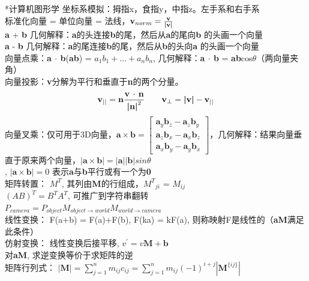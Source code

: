 \documentclass[UTF8]{ctexart}
\makeatletter
\renewcommand{\section}{\@startsection{section}{1}{0mm}
  {-\baselineskip}{0.5\baselineskip}{\bf\leftline}}
\makeatother
\begin{document}
\section*{计算机图形学}
\noindent 坐标系模拟：拇指x，食指y，中指z。左手系和右手系\\
标准化向量 = 单位向量 = 法线，$\textbf{v}_{norm} = \frac{\textbf{v}}{\textbf{\textbar v\textbar }}$\\
\textbf{a} + \textbf{b} 几何解释：\textbf{a}的头连接\textbf{b}的尾，然后从\textbf{a}的尾向\textbf{b} 的头画一个向量\\
\textbf{a} - \textbf{b} 几何解释：\textbf{a}的尾连接\textbf{b}的尾，然后从\textbf{b}的头向\textbf{a} 的头画一个向量\\
向量点乘：\textbf{a $\cdot$ b}(\textbf{ab}) = \textbf{$a_1b_1+...+a_nb_n$}, 几何解释：\textbf{a $\cdot$ b} = \textbf{\textbar a\textbar \textbar b\textbar }cos$\theta$（两向量夹角）\\
向量投影：\textbf{v}分解为平行和垂直于\textbf{n}的两个分量。\\
\[ \textbf{v}_{||} = \textbf{n}\frac{\textbf{v $\cdot$ n}}{\textbf{\textbar n\textbar }^2} \qquad \textbf{v}_{\bot} = \textbf{\textbar v\textbar } - \textbf{v}_{||}\]
向量叉乘：仅可用于3D向量，$\textbf{a}\times\textbf{b} = \begin{bmatrix} \textbf{a}_y\textbf{b}_z - \textbf{a}_z\textbf{b}_y \\ \textbf{a}_z\textbf{b}_x - \textbf{a}_x\textbf{b}_z \\ \textbf{a}_x\textbf{b}_y - \textbf{a}_y\textbf{b}_x \end{bmatrix}$，几何解释：结果向量垂直于原来两个向量，$|\textbf{a}\times\textbf{b}| = |\textbf{a}||\textbf{b}|sin\theta$\\, $|\textbf{a}\times\textbf{b}| = 0$ 表示\textbf{a}与\textbf{b}平行或有一个为\textbf{0}\\
矩阵转置： \textbf{$M^T$}, 其列由\textbf{M}的行组成，\textbf{${M^T}_{ji}$} = \textbf{$M_{ij}$}\\
\textbf{${(AB)}^T = {B^T}{A^T}$}, 可推广到字符串翻转\\
$P_{camera} = P_{object}M_{object\to world}M_{world\to camera}$\\
线性变换： F(a+b) = F(a)+F(b), F(ka) = kF(a), 则称映射F是线性的（\textbf{aM}满足此条件）\\
仿射变换： 线性变换后接平移, $v^{'} = v\textbf{M} + \textbf{b}$\\
对\textbf{aM}, 求逆变换等价于求矩阵的逆\\
矩阵行列式： $|\textbf{M}|  = \sum_{j=1}^{n}m_{ij}c_{ij} = \sum_{j=1}^{n}m_{ij}(-1)^{i+j}| \textbf{M}^{\{ij\}}|$\\
\end{document}
